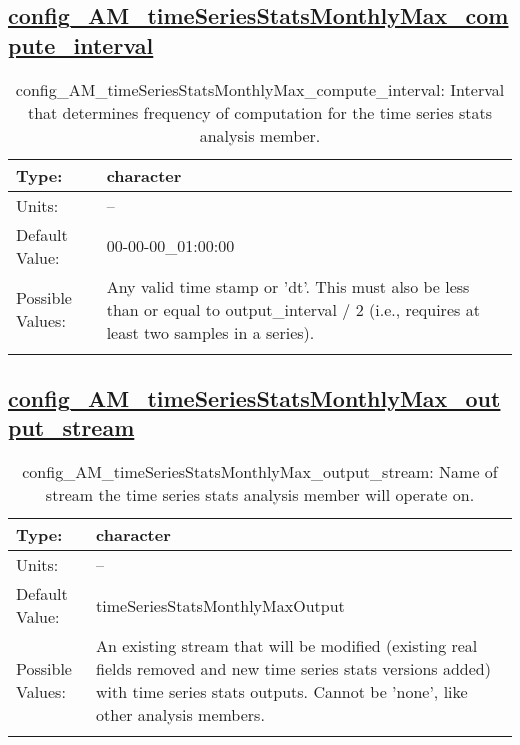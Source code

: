 \subsection[config\_AM\_timeSeriesStatsMonthlyMax\_compute\_interval]{\hyperref[sec:nm_tab_AM_timeSeriesStatsMonthlyMax]{config\_AM\_timeSeriesStatsMonthlyMax\_compute\_interval}}
\label{subsec:nm_sec_config_AM_timeSeriesStatsMonthlyMax_compute_interval}
\begin{center}
\begin{longtable}{| p{2.0in} || p{4.0in} |}
    \hline
    Type: & character \\
    \hline
    Units: & -- \\
    \hline
    Default Value: & 00-00-00\_01:00:00 \\
    \hline
    Possible Values: & Any valid time stamp or 'dt'. This must also be less than or equal to output\_interval / 2 (i.e., requires at least two samples in a series). \\
    \hline
    \caption{config\_AM\_timeSeriesStatsMonthlyMax\_compute\_interval: Interval that determines frequency of computation for the time series stats analysis member.}
\end{longtable}
\end{center}
\subsection[config\_AM\_timeSeriesStatsMonthlyMax\_output\_stream]{\hyperref[sec:nm_tab_AM_timeSeriesStatsMonthlyMax]{config\_AM\_timeSeriesStatsMonthlyMax\_output\_stream}}
\label{subsec:nm_sec_config_AM_timeSeriesStatsMonthlyMax_output_stream}
\begin{center}
\begin{longtable}{| p{2.0in} || p{4.0in} |}
    \hline
    Type: & character \\
    \hline
    Units: & -- \\
    \hline
    Default Value: & timeSeriesStatsMonthlyMaxOutput \\
    \hline
    Possible Values: & An existing stream that will be modified (existing real fields removed and new time series stats versions added) with time series stats outputs. Cannot be 'none', like other analysis members. \\
    \hline
    \caption{config\_AM\_timeSeriesStatsMonthlyMax\_output\_stream: Name of stream the time series stats analysis member will operate on.}
\end{longtable}
\end{center}
